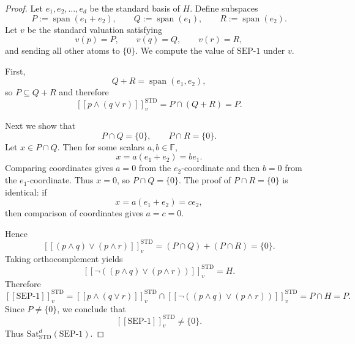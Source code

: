 \documentclass[10pt,a4paper]{amsart}
\newcommand{\SEPone}{\mathrm{SEP}\text{-}1}
\newcommand{\STD}{\mathrm{STD}}
\newcommand{\Sat}{\mathrm{Sat}}
\newcommand{\field}{\mathbb{F}}
\newcommand{\sem}[1]{\left[\!\left[#1\right]\!\right]}
\begin{document}
\begin{proof}
Let $e_1,e_2,\dots,e_d$ be the standard basis of $H$.
Define subspaces
\[
P:=\operatorname{span}(e_1+e_2),
\qquad
Q:=\operatorname{span}(e_1),
\qquad
R:=\operatorname{span}(e_2).
\]
Let $v$ be the standard valuation satisfying
\[
 v(p)=P,
 \qquad
 v(q)=Q,
 \qquad
 v(r)=R,
\]
and sending all other atoms to $\{0\}$.
We compute the value of $\SEPone$ under $v$.

First,
\[
Q+R = \operatorname{span}(e_1,e_2),
\]
so $P\subseteq Q+R$ and therefore
\[
\sem{p\wedge(q\vee r)}^{\STD}_v = P\cap(Q+R)=P.
\]

Next we show that
\[
P\cap Q = \{0\},
\qquad
P\cap R = \{0\}.
\]
Let $x\in P\cap Q$.
Then for some scalars $a,b\in\field$,
\[
 x=a(e_1+e_2)=be_1.
\]
Comparing coordinates gives $a=0$ from the $e_2$-coordinate and then $b=0$ from the $e_1$-coordinate.
Thus $x=0$, so $P\cap Q=\{0\}$.
The proof of $P\cap R=\{0\}$ is identical: if
\[
 x=a(e_1+e_2)=ce_2,
\]
then comparison of coordinates gives $a=c=0$.

Hence
\[
\sem{(p\wedge q)\vee(p\wedge r)}^{\STD}_v
=
(P\cap Q)+(P\cap R)
=
\{0\}.
\]
Taking orthocomplement yields
\[
\sem{\neg((p\wedge q)\vee(p\wedge r))}^{\STD}_v = H.
\]
Therefore
\[
\sem{\SEPone}^{\STD}_v
=
\sem{p\wedge(q\vee r)}^{\STD}_v \cap \sem{\neg((p\wedge q)\vee(p\wedge r))}^{\STD}_v
=
P\cap H = P.
\]
Since $P\neq\{0\}$, we conclude that
\[
\sem{\SEPone}^{\STD}_v\neq\{0\}.
\]
Thus $\Sat_{\STD}^d(\SEPone)$.
\end{proof}
\end{document}
